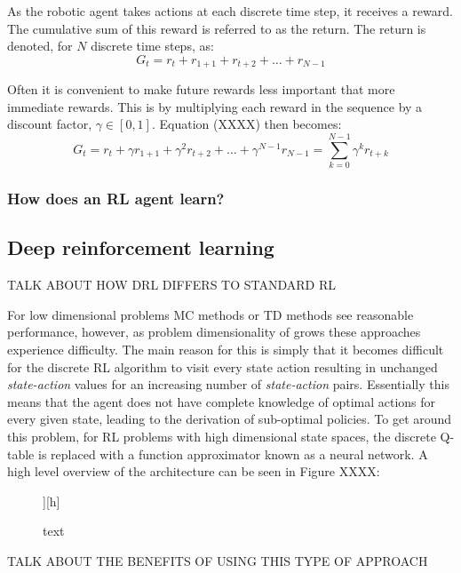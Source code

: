 \documentclass[12pt, a4paper]{article}
\begin{document}
As the robotic agent takes actions at each discrete time step, it receives a reward. The cumulative sum of this reward is referred to as the return. The return is denoted, for $N$ discrete time steps, as:
\begin{equation}
G_t = r_t + r_{1+1} + r_{t+2} + \ldots + r_{N-1}
\end{equation}

Often it is convenient to make future rewards less important that more immediate rewards. This is by multiplying each reward in the sequence by a discount factor, $\gamma \in [0,1]$. Equation (XXXX) then becomes:
\begin{equation}
G_t = r_t + \gamma r_{1+1} + \gamma^2 r_{t+2} + \ldots + \gamma^{N-1} r_{N-1} = \sum_{k = 0}^{N-1} \gamma^k r_{t+k}
\end{equation}

\subsubsection{How does an RL agent learn?}




\subsection{Deep reinforcement learning}

TALK ABOUT HOW DRL DIFFERS TO STANDARD RL

For low dimensional problems MC methods or TD methods see reasonable performance, however, as problem dimensionality of grows these approaches experience difficulty. The main reason for this is simply that it becomes difficult for the discrete RL algorithm to visit every state action resulting in unchanged \textit{state-action} values for an increasing number of \textit{state-action} pairs. Essentially this means that the agent does not have complete knowledge of optimal actions for every given state, leading to the derivation of sub-optimal policies. To get around this problem, for RL problems with high dimensional state spaces, the discrete Q-table is replaced with a function approximator known as a neural network. A high level overview of the architecture can be seen in Figure XXXX:
\begin{figure}][h]
\centering
\caption{text}
\end{figure}



TALK ABOUT THE BENEFITS OF USING THIS TYPE OF APPROACH
\end{document}
